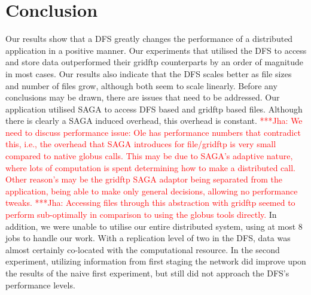 \documentclass{rspublic}
\newcommand{\jhanote}[1]{ {\textcolor{red} { ***Jha: #1 }}}
\newcommand{\jhanote}[1]{}
\begin{document}
\section{Conclusion}
Our results show that a DFS greatly changes the performance of a
distributed application in a positive manner. Our experiments that
utilised the DFS to access and store data outperformed their gridftp
counterparts by an order of magnitude in most cases. Our results also
indicate that the DFS scales better as file sizes and number of files
grow, although both seem to scale linearly. Before any conclusions may
be drawn, there are issues that need to be addressed. Our application
utilised SAGA to access DFS based and gridftp based files. Although
there is clearly a SAGA induced overhead, this overhead is constant.
\jhanote{ We need to discuss performance issue: Ole has performance
numbers that contradict this, i.e., the overhead that SAGA introduces
for file/gridftp is very small compared to native globus calls. This may
be due to SAGA's adaptive nature, where lots of computation is spent
determining how to make a distributed call. Other reason's may be the
gridftp SAGA adaptor being separated from the application, being able to
make only general decisions, allowing no performance tweaks. }
\jhanote{Accessing files through this abstraction with gridftp seemed to
perform sub-optimally in comparison to using the globus tools directly.}
In addition, we were unable to utilise our entire distributed system,
using at most 8 jobs to handle our work. With a replication level of two
in the DFS, data was almost certainly co-located with the computational
resource. In the second experiment, utilizing information from first
staging the network did improve upon the results of the naive first
experiment, but still did not approach the DFS's performance levels.
\end{document}

